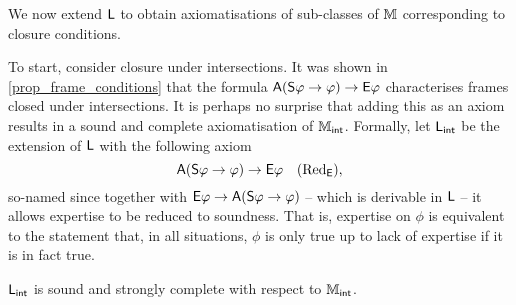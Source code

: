 We now extend $\mathsf{L}$ to obtain axiomatisations of sub-classes of $\mathbb{M}$
corresponding to closure conditions.

To start, consider closure under intersections. It was shown in
\cref{prop_frame_conditions} that the formula $\mathsf{A}(\mathsf{S}\varphi \to
\varphi) \to \mathsf{E}\varphi$ characterises frames closed under intersections. It is
perhaps no surprise that adding this as an axiom results in a sound and
complete axiomatisation of $\mathbb{M}_{\mathsf{int}}$. Formally, let $\mathsf{L}_{\mathsf{int}}$ be the
extension of $\mathsf{L}$ with the following axiom
\[
    \mathsf{A}(\mathsf{S}\varphi \to \varphi) \to \mathsf{E}\varphi \quad (\text{Red}_{\mathsf{E}}),
\]
so-named since together with $\mathsf{E}\varphi \to \mathsf{A}(\mathsf{S}\varphi \to \varphi)$
-- which is derivable in $\mathsf{L}$ -- it allows expertise to be reduced
to soundness. That is, expertise on $\phi$ is equivalent to the statement that,
in all situations, $\phi$ is only true up to lack of expertise if it is in fact
true.

\begin{theorem}
\label{thm_mint_axiomatisation}
$\mathsf{L}_{\mathsf{int}}$ is sound and strongly complete with respect to
$\mathbb{M}_{\mathsf{int}}$.
\end{theorem}

